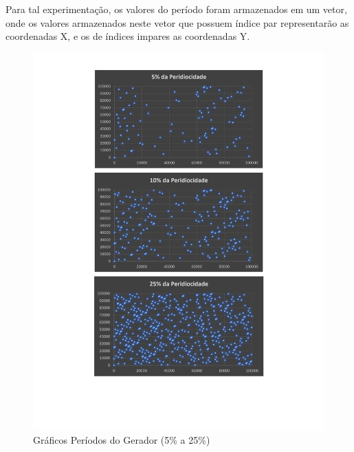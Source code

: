 Para tal experimentação, os valores do período foram armazenados em um vetor, onde os valores armazenados neste vetor que possuem índice par representarão as coordenadas X, e os de índices impares as coordenadas Y.
\newpage
\begin{figure}[ht]

    \includegraphics[scale=0.74]{JoseGeraldo-lista2/fig/fig1.pdf}
    \caption{Gráficos Períodos do Gerador (5\% a 25\%)}

\end{figure}
\newpage
